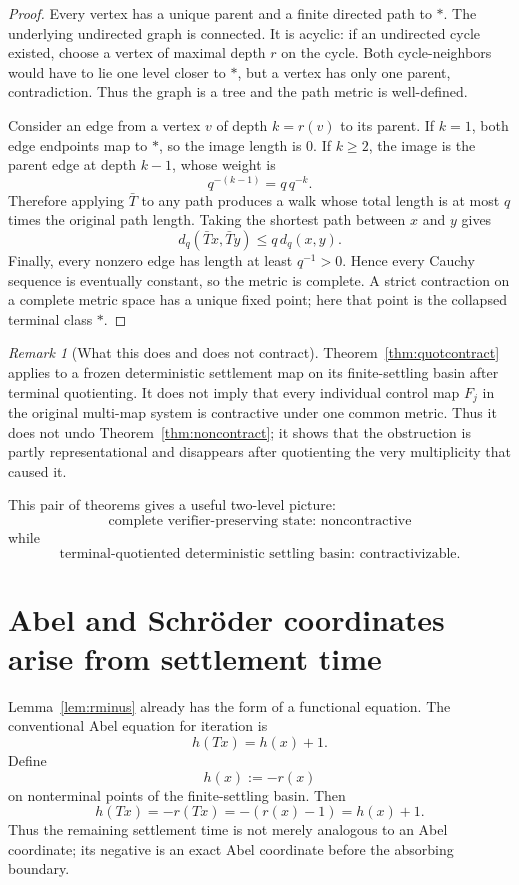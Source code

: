 \documentclass[11pt]{article}
\theoremstyle{definition}
\theoremstyle{remark}
\newtheorem{remark}[theorem]{Remark}
\begin{document}
\begin{proof}
Every vertex has a unique parent and a finite directed path to $*$. The underlying undirected graph is connected. It is acyclic: if an undirected cycle existed, choose a vertex of maximal depth $r$ on the cycle. Both cycle-neighbors would have to lie one level closer to $*$, but a vertex has only one parent, contradiction. Thus the graph is a tree and the path metric is well-defined.

Consider an edge from a vertex $v$ of depth $k=r(v)$ to its parent. If $k=1$, both edge endpoints map to $*$, so the image length is $0$. If $k\ge2$, the image is the parent edge at depth $k-1$, whose weight is
\[
q^{-(k-1)}=q\,q^{-k}.
\]
Therefore applying $\bar T$ to any path produces a walk whose total length is at most $q$ times the original path length. Taking the shortest path between $x$ and $y$ gives
\[
d_q(\bar T x,\bar T y)\le q\,d_q(x,y).
\]
Finally, every nonzero edge has length at least $q^{-1}>0$. Hence every Cauchy sequence is eventually constant, so the metric is complete. A strict contraction on a complete metric space has a unique fixed point; here that point is the collapsed terminal class $*$.
\end{proof}

\begin{remark}[What this does and does not contract]
Theorem~\ref{thm:quotcontract} applies to a frozen deterministic settlement map on its finite-settling basin after terminal quotienting. It does not imply that every individual control map $F_j$ in the original multi-map system is contractive under one common metric. Thus it does not undo Theorem~\ref{thm:noncontract}; it shows that the obstruction is partly representational and disappears after quotienting the very multiplicity that caused it.
\end{remark}

This pair of theorems gives a useful two-level picture:
\[
\boxed{\text{complete verifier-preserving state: noncontractive}}
\]
while
\[
\boxed{\text{terminal-quotiented deterministic settling basin: contractivizable}.}
\]

\section{Abel and Schr\"oder coordinates arise from settlement time}

Lemma~\ref{lem:rminus} already has the form of a functional equation. The conventional Abel equation for iteration is
\[
h(Tx)=h(x)+1.
\]
Define
\[
h(x):=-r(x)
\]
on nonterminal points of the finite-settling basin. Then
\[
h(Tx)=-r(Tx)=-(r(x)-1)=h(x)+1.
\]
Thus the remaining settlement time is not merely analogous to an Abel coordinate; its negative is an exact Abel coordinate before the absorbing boundary.
\end{document}
